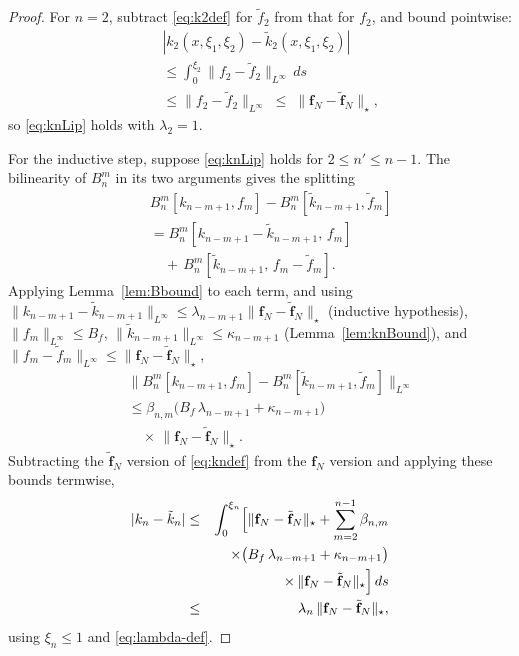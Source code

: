 \documentclass[10pt,a4paper]{amsart}
\newcommand{\Linf}{L^\infty}
\begin{document}
\begin{proof}
For $n=2$, subtract \eqref{eq:k2def} for $\tilde f_2$ from that for $f_2$, and bound pointwise:
\begin{eqnarray}
&& |k_2(x,\xi_1,\xi_2) - \tilde k_2(x,\xi_1,\xi_2)| \nonumber \\
&& \le \int_0^{\xi_2} \|f_2 - \tilde f_2\|_{\Linf}\,ds \nonumber \\
&& \le \|f_2 - \tilde f_2\|_{\Linf}
\;\le\; \|\mathbf{f}_N-\tilde{\mathbf{f}}_N\|_\star,
\label{eq:k2diff-pw}
\end{eqnarray}
so \eqref{eq:knLip} holds with $\lambda_2 = 1$.

For the inductive step, suppose \eqref{eq:knLip} holds for $2\le n'\le n-1$. The bilinearity of $B_n^m$ in its two arguments gives the splitting
\begin{eqnarray}
&& B_n^m[k_{n-m+1},f_m] - B_n^m[\tilde k_{n-m+1},\tilde f_m] \nonumber \\
&& = B_n^m[k_{n-m+1}-\tilde k_{n-m+1},\,f_m] \nonumber \\
&& \quad +\, B_n^m[\tilde k_{n-m+1},\,f_m - \tilde f_m].
\label{eq:B-bilinear-split}
\end{eqnarray}
Applying Lemma~\ref{lem:Bbound} to each term, and using $\|k_{n-m+1}-\tilde k_{n-m+1}\|_{\Linf}\le \lambda_{n-m+1}\|\mathbf{f}_N-\tilde{\mathbf{f}}_N\|_\star$ (inductive hypothesis), $\|f_m\|_{\Linf}\le B_f$, $\|\tilde k_{n-m+1}\|_{\Linf}\le\kappa_{n-m+1}$ (Lemma~\ref{lem:knBound}), and $\|f_m-\tilde f_m\|_{\Linf}\le\|\mathbf{f}_N-\tilde{\mathbf{f}}_N\|_\star$,
\begin{eqnarray}
&& \|B_n^m[k_{n-m+1},f_m] - B_n^m[\tilde k_{n-m+1},\tilde f_m]\|_{\Linf} \nonumber \\
&& \le \beta_{n,m}\bigl(B_f\,\lambda_{n-m+1} + \kappa_{n-m+1}\bigr) \nonumber \\
&& \quad \times\, \|\mathbf{f}_N-\tilde{\mathbf{f}}_N\|_\star.
\label{eq:Bdiff-bnd}
\end{eqnarray}
Subtracting the $\tilde{\mathbf{f}}_N$ version of \eqref{eq:kndef} from the $\mathbf{f}_N$ version and applying these bounds termwise,
\begin{eqnarray}
|k_n - \tilde k_n| &\le& \int_0^{\xi_n}\Bigl[\|\mathbf{f}_N-\tilde{\mathbf{f}}_N\|_\star + \sum_{m=2}^{n-1} \beta_{n,m} \nonumber \\
&& \times\bigl(B_f\,\lambda_{n-m+1} + \kappa_{n-m+1}\bigr) \nonumber \\
&& \times\, \|\mathbf{f}_N-\tilde{\mathbf{f}}_N\|_\star\Bigr]\,ds \nonumber \\
&\le& \lambda_n\,\|\mathbf{f}_N-\tilde{\mathbf{f}}_N\|_\star,
\label{eq:kndiff-pw}
\end{eqnarray}
using $\xi_n\le 1$ and \eqref{eq:lambda-def}.
\end{proof}
\end{document}
